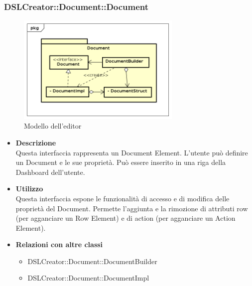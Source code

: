  \subsubsection{DSLCreator::Document::Document}
                \begin{figure}[H]
                  \centering
                  \includegraphics[width=0.7\textwidth]{res/img/Document.png}
                  \caption{Modello dell'editor}
                  \label{fig:diagram_model}
                \end{figure}
                    \begin{itemize}
                        \item \textbf{Descrizione} \hfill \\
                            Questa interfaccia rappresenta un Document Element. L'utente può definire un Document e le sue proprietà. Può essere inserito in una riga della Dashboard dell'utente.
                        \item \textbf{Utilizzo} \hfill \\
                            Questa interfaccia espone le funzionalità di accesso e di modifica delle proprietà del Document. Permette l'aggiunta e la rimozione di attributi row (per agganciare un Row Element) e di action (per agganciare un Action Element).
                        \item \textbf{Relazioni con altre classi}
                            \begin{itemize}
                              \item DSLCreator::Document::DocumentBuilder
                              \item DSLCreator::Document::DocumentImpl
                            \end{itemize}
                    \end{itemize}

